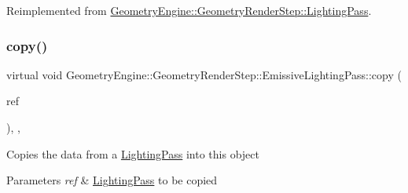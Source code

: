 Reimplemented from \mbox{\hyperlink{class_geometry_engine_1_1_geometry_render_step_1_1_lighting_pass_a4f1cb36c7bf6a90d0aa3b8e8feba5e5e}{Geometry\+Engine\+::\+Geometry\+Render\+Step\+::\+Lighting\+Pass}}.

\mbox{\label{class_geometry_engine_1_1_geometry_render_step_1_1_emissive_lighting_pass_a1856a521c04820f16f8f2516c65036d0}} 
\subsubsection{\texorpdfstring{copy()}{copy()}}
{\footnotesize\ttfamily virtual void Geometry\+Engine\+::\+Geometry\+Render\+Step\+::\+Emissive\+Lighting\+Pass\+::copy (\begin{DoxyParamCaption}\item[{const \mbox{\hyperlink{class_geometry_engine_1_1_geometry_render_step_1_1_emissive_lighting_pass}{Emissive\+Lighting\+Pass}} \&}]{ref }\end{DoxyParamCaption})\hspace{0.3cm}{\ttfamily [inline]}, {\ttfamily [protected]}, {\ttfamily [virtual]}}

Copies the data from a \mbox{\hyperlink{class_geometry_engine_1_1_geometry_render_step_1_1_lighting_pass}{Lighting\+Pass}} into this object 
\begin{DoxyParams}{Parameters}
{\em ref} & \mbox{\hyperlink{class_geometry_engine_1_1_geometry_render_step_1_1_lighting_pass}{Lighting\+Pass}} to be copied \\
\hline
\end{DoxyParams}
\mbox{\label{class_geometry_engine_1_1_geometry_render_step_1_1_emissive_lighting_pass_adffe18f64968290aedda426bc4450414}} 
